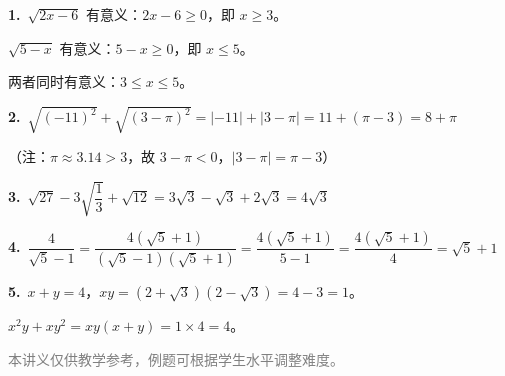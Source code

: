 \documentclass[12pt, a4paper]{ctexart}
\begin{document}
\begin{knowledgebox}[参考答案]
\textbf{1.}\ $\sqrt{2x-6}$ 有意义：$2x - 6 \geqslant 0$，即 $x \geqslant 3$。

$\sqrt{5-x}$ 有意义：$5 - x \geqslant 0$，即 $x \leqslant 5$。

两者同时有意义：$3 \leqslant x \leqslant 5$。

\medskip
\textbf{2.}\ $\sqrt{(-11)^2} + \sqrt{(3-\pi)^2} = |-11| + |3 - \pi| = 11 + (\pi - 3) = 8 + \pi$

（注：$\pi \approx 3.14 > 3$，故 $3 - \pi < 0$，$|3-\pi| = \pi - 3$）

\medskip
\textbf{3.}\ $\sqrt{27} - 3\sqrt{\dfrac{1}{3}} + \sqrt{12} = 3\sqrt{3} - \sqrt{3} + 2\sqrt{3} = 4\sqrt{3}$

\medskip
\textbf{4.}\ $\dfrac{4}{\sqrt{5}-1} = \dfrac{4(\sqrt{5}+1)}{(\sqrt{5}-1)(\sqrt{5}+1)} = \dfrac{4(\sqrt{5}+1)}{5-1} = \dfrac{4(\sqrt{5}+1)}{4} = \sqrt{5}+1$

\medskip
\textbf{5.}\ $x + y = 4$，$xy = (2+\sqrt{3})(2-\sqrt{3}) = 4 - 3 = 1$。

$x^2y + xy^2 = xy(x + y) = 1 \times 4 = 4$。
\end{knowledgebox}

\vfill
\begin{center}
\small\textcolor{gray}{本讲义仅供教学参考，例题可根据学生水平调整难度。}
\end{center}
\end{document}
